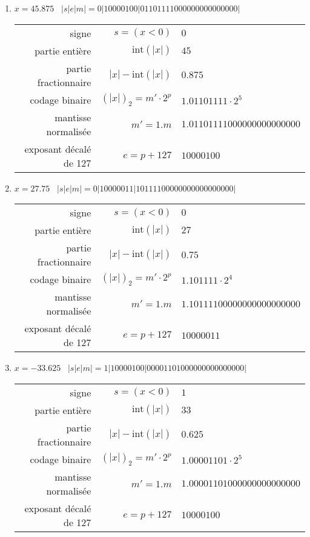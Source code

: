 \documentclass[11pt,a4paper]{article}
\begin{document}
\begin{enumerate}
\item $x = 45.875$ \dotfill\ {$|s|e|m| = 0|10000100|01101111000000000000000|$}
{\footnotesize
\begin{tabular}{r@{ : }r@{ $=$ }l}
signe 					& $s = (x < 0)$ 			& $0$ \\
partie entière 			& $\mbox{int}(|x|)$ 		& $45$ \\
partie fractionnaire 	& $|x| - \mbox{int}(|x|)$ 	& $0.875$ \\
codage binaire 			& $(|x|)_2 = m'\cdot 2^p$   & $1.01101111 \cdot 2^{5}$ \\
mantisse normalisée 	& $m' = 1.m$ 				& $1.01101111000000000000000$ \\
exposant décalé de 127 	& $e = p+127$ 				& $10000100$ \\[2mm]
\end{tabular}
}

\item $x = 27.75$ \dotfill\ {$|s|e|m| = 0|10000011|10111100000000000000000|$}
{\footnotesize
\begin{tabular}{r@{ : }r@{ $=$ }l}
signe 					& $s = (x < 0)$ 			& $0$ \\
partie entière 			& $\mbox{int}(|x|)$ 		& $27$ \\
partie fractionnaire 	& $|x| - \mbox{int}(|x|)$ 	& $0.75$ \\
codage binaire 			& $(|x|)_2 = m'\cdot 2^p$   & $1.101111 \cdot 2^{4}$ \\
mantisse normalisée 	& $m' = 1.m$ 				& $1.10111100000000000000000$ \\
exposant décalé de 127 	& $e = p+127$ 				& $10000011$ \\[2mm]
\end{tabular}
}

\item $x = -33.625$ \dotfill\ {$|s|e|m| = 1|10000100|00001101000000000000000|$}
{\footnotesize
\begin{tabular}{r@{ : }r@{ $=$ }l}
signe 					& $s = (x < 0)$ 			& $1$ \\
partie entière 			& $\mbox{int}(|x|)$ 		& $33$ \\
partie fractionnaire 	& $|x| - \mbox{int}(|x|)$ 	& $0.625$ \\
codage binaire 			& $(|x|)_2 = m'\cdot 2^p$   & $1.00001101 \cdot 2^{5}$ \\
mantisse normalisée 	& $m' = 1.m$ 				& $1.00001101000000000000000$ \\
exposant décalé de 127 	& $e = p+127$ 				& $10000100$ \\[2mm]
\end{tabular}
}


\end{enumerate}
\end{document}
